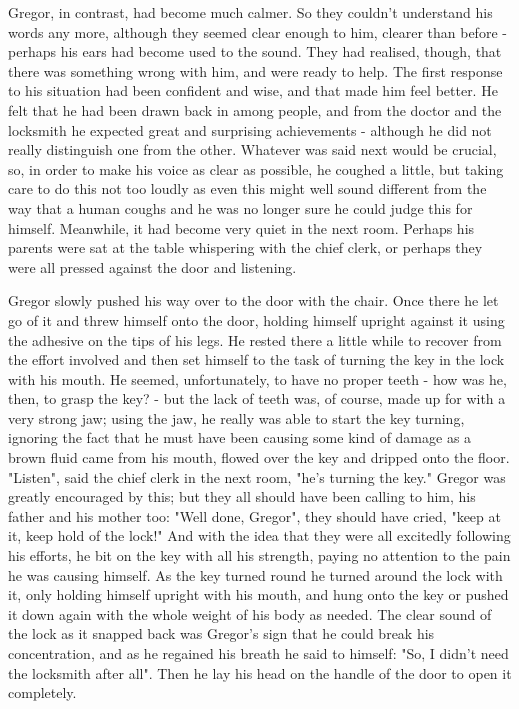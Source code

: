 Gregor, in contrast, had become much calmer. So they couldn't understand his words any more, although they seemed clear enough to him, clearer than before - perhaps his ears had become used to the sound. They had realised, though, that there was something wrong with him, and were ready to help. The first response to his situation had been confident and wise, and that made him feel better. He felt that he had been drawn back in among people, and from the doctor and the locksmith he expected great and surprising achievements - although he did not really distinguish one from the other. Whatever was said next would be crucial, so, in order to make his voice as clear as possible, he coughed a little, but taking care to do this not too loudly as even this might well sound different from the way that a human coughs and he was no longer sure he could judge this for himself. Meanwhile, it had become very quiet in the next room. Perhaps his parents were sat at the table whispering with the chief clerk, or perhaps they were all pressed against the door and listening.

Gregor slowly pushed his way over to the door with the chair. Once there he let go of it and threw himself onto the door, holding himself upright against it using the adhesive on the tips of his legs. He rested there a little while to recover from the effort involved and then set himself to the task of turning the key in the lock with his mouth. He seemed, unfortunately, to have no proper teeth - how was he, then, to grasp the key? - but the lack of teeth was, of course, made up for with a very strong jaw; using the jaw, he really was able to start the key turning, ignoring the fact that he must have been causing some kind of damage as a brown fluid came from his mouth, flowed over the key and dripped onto the floor. "Listen", said the chief clerk in the next room, "he's turning the key." Gregor was greatly encouraged by this; but they all should have been calling to him, his father and his mother too: "Well done, Gregor", they should have cried, "keep at it, keep hold of the lock!" And with the idea that they were all excitedly following his efforts, he bit on the key with all his strength, paying no attention to the pain he was causing himself. As the key turned round he turned around the lock with it, only holding himself upright with his mouth, and hung onto the key or pushed it down again with the whole weight of his body as needed. The clear sound of the lock as it snapped back was Gregor's sign that he could break his concentration, and as he regained his breath he said to himself: "So, I didn't need the locksmith after all". Then he lay his head on the handle of the door to open it completely.

